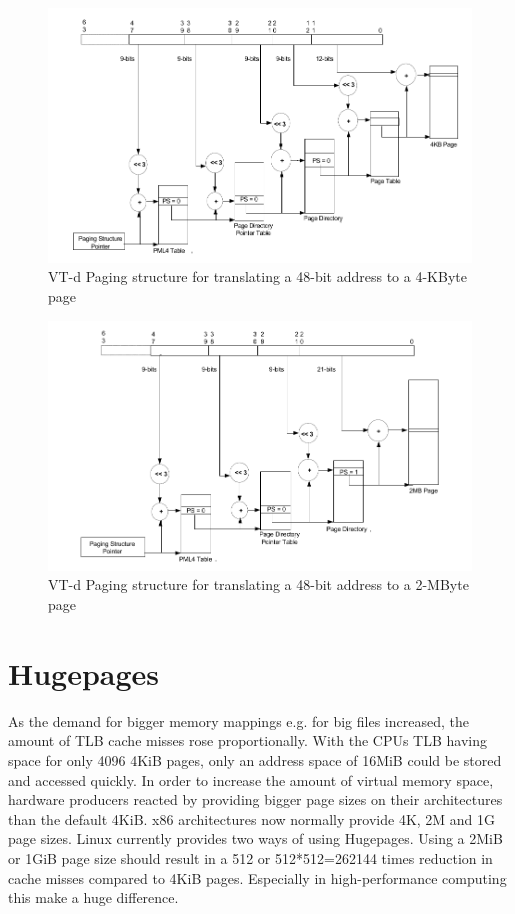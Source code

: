 \begin{figure}
    \centering
    \includegraphics[width=\textwidth]{figures/4kibtranslation.pdf}
    \caption{VT-d Paging structure for translating a 48-bit address to a 4-KByte page}
    \label{fig:pagewalk4kib}
\end{figure}
\begin{figure}
    \centering
    \includegraphics[width=\textwidth]{figures/2mibtranslation.pdf}
    \caption{VT-d Paging structure for translating a 48-bit address to a 2-MByte page}
    \label{fig:pagewalk2mib}
\end{figure}


\section{Hugepages}
As the demand for bigger memory mappings e.g. for big files increased, the amount of TLB cache misses rose proportionally. With the CPUs TLB having space for only 4096 4KiB pages, only an address space of 16MiB could be stored and accessed quickly. In order to increase the amount of virtual memory space, hardware producers reacted by providing bigger page sizes on their architectures than the default 4KiB. x86 architectures now normally provide 4K, 2M and 1G page sizes.
Linux currently provides two ways of using Hugepages.
Using a 2MiB or 1GiB page size should result in a 512 or 512*512=262144 times reduction in cache misses compared to 4KiB pages. Especially in high-performance computing this make a huge difference.

